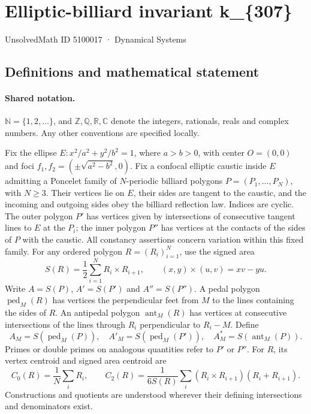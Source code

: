 \documentclass[11pt]{article}
\begin{document}
\setcounter{section}{5100016}
\section{Elliptic-billiard invariant k\_\{307\}}\label{5100017}
{\small\sffamily UnsolvedMath ID 5100017 · Dynamical Systems}
\subsection{Definitions and mathematical statement}

\paragraph{Shared notation.}$\mathbb N=\{1,2,\ldots\}$, and $\mathbb Z,\mathbb Q,\mathbb R,\mathbb C$ denote the integers, rationals, reals and complex numbers. Any other conventions are specified locally.


Fix the ellipse $E:x^2/a^2+y^2/b^2=1$, where $a>b>0$, with center $O=(0,0)$ and foci $f_1,f_2=(\pm\sqrt{a^2-b^2},0)$. Fix a confocal elliptic caustic inside $E$ admitting a Poncelet family of $N$-periodic billiard polygons $P=(P_1,\ldots,P_N)$, with $N\geq3$. Their vertices lie on $E$, their sides are tangent to the caustic, and the incoming and outgoing sides obey the billiard reflection law. Indices are cyclic. The outer polygon $P'$ has vertices given by intersections of consecutive tangent lines to $E$ at the $P_i$; the inner polygon $P''$ has vertices at the contacts of the sides of $P$ with the caustic. All constancy assertions concern variation within this fixed family.
For any ordered polygon $R=(R_i)_{i=1}^N$, use the signed area
\[S(R)=\frac12\sum_{i=1}^N R_i\times R_{i+1},\qquad (x,y)\times(u,v)=xv-yu.\]
Write $A=S(P)$, $A'=S(P')$ and $A''=S(P'')$. A pedal polygon $\operatorname{ped}_M(R)$ has vertices the perpendicular feet from $M$ to the lines containing the sides of $R$. An antipedal polygon $\operatorname{ant}_M(R)$ has vertices at consecutive intersections of the lines through $R_i$ perpendicular to $R_i-M$. Define
\[A_M=S(\operatorname{ped}_M(P)),\quad A'_M=S(\operatorname{ped}_M(P')),\quad A_M^*=S(\operatorname{ant}_M(P)).\]
Primes or double primes on analogous quantities refer to $P'$ or $P''$. For $R$, its vertex centroid and signed area centroid are
\[C_0(R)=\frac1N\sum_i R_i,\qquad C_2(R)=\frac{1}{6S(R)}\sum_i(R_i\times R_{i+1})(R_i+R_{i+1}).\]
Constructions and quotients are understood wherever their defining intersections and denominators exist.
\end{document}
